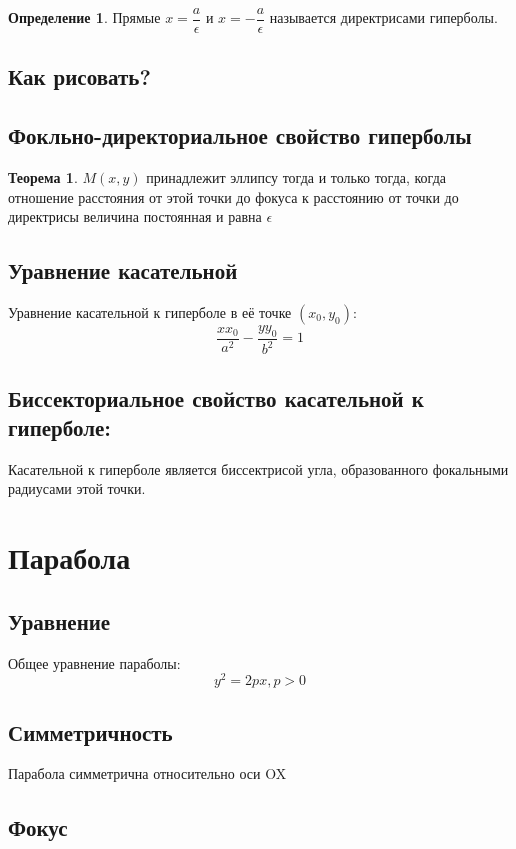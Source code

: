 \documentclass{article}
\theoremstyle{definition}
\newtheorem{definition}{Определение}
\newtheorem{theorem}{Теорема}[section]
\begin{document}
\begin{definition} Прямые $x = \dfrac{a}{\epsilon}$ и $x = -\dfrac{a}{\epsilon}$ называется директрисами гиперболы. 
\end{definition}
\subsection{Как рисовать?}

\subsection{Фокльно-директориальное свойство гиперболы}

\begin{theorem}  $M(x, y)$ принадлежит эллипсу тогда и только тогда, когда отношение расстояния от этой точки до фокуса к расстоянию от точки до директрисы величина постоянная и равна $\epsilon$
\end{theorem}

\subsection{Уравнение касательной} Уравнение касательной к гиперболе в её точке $(x_0,  y_0)$: 
$$\frac{x x_0}{a ^ 2} - \frac{y y_0}{b^2} = 1$$

\subsection{Биссекториальное свойство касательной к гиперболе:} 

Касательной к гиперболе является биссектрисой угла, образованного фокальными радиусами этой точки. 

\section{Парабола} 
\subsection{Уравнение}

Общее уравнение параболы: $$y^2 = 2 p x, p > 0$$  

\subsection{Симметричность}

Парабола симметрична относительно оси OX

\subsection{Фокус}
\end{document}

